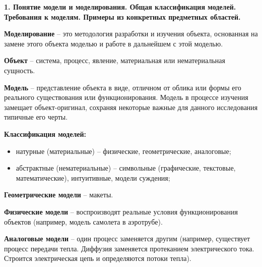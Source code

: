 \documentclass[a4paper,14pt]{article}
\begin{document}

\textbf{1. Понятие модели и моделирования. Общая классификация моделей. Требования к моделям. Примеры из конкретных предметных областей.}

\textbf{Моделирование} -- это методология разработки и изучения объекта, основанная на замене этого
объекта моделью и работе в дальнейшем с этой моделью.

\textbf{Объект} -- система, процесс, явление, материальная или нематериальная сущность.

\textbf{Модель} -- представление объекта в виде, отличном от облика или формы его реального существования или функционирования.
Модель в процессе изучения замещает объект-оригинал, сохраняя некоторые важные для данного исследования типичные его черты.

\textbf{Классификация моделей:}
\begin{itemize}
	\item натурные (материальные) -- физические, геометрические, аналоговые;
	\item абстрактные (нематериальные) -- символьные (графические, текстовые, математические), интуитивные, модели суждения;
\end{itemize}

\begin{figure}[!h]
	\label{fig:klassifik}
\end{figure}

\textbf{Геометрические модели} -- макеты.

\textbf{Физические модели} -- воспроизводят реальные условия функционирования объектов
(например, модель самолета в аэротрубе).

\textbf{Аналоговые модели} -- один процесс заменяется другим (например, существует процесс передачи тепла.
Диффузия заменяется протеканием электрического тока. Строится электрическая цепь
и определяются потоки тепла).
\end{document}
